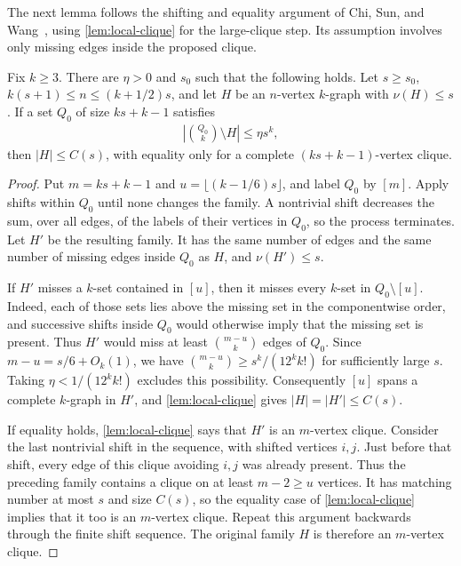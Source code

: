 The next lemma follows the shifting and equality argument of Chi, Sun, and Wang~\cite[Theorem 8.8]{CSW2026}, using \cref{lem:local-clique} for the large-clique step. Its assumption involves only missing edges inside the proposed clique.
\begin{lemma}\label{lem:clique-exact}
Fix $k\ge3$. There are $\eta>0$ and $s_0$ such that the following holds. Let $s\ge s_0$, $k(s+1)\le n\le(k+1/2)s$, and let $H$ be an $n$-vertex $k$-graph with $\nu(H)\le s$. If a set $Q_0$ of size $ks+k-1$ satisfies
\begin{align*}
\left|\binom{Q_0}k\setminus H\right|\le\eta s^k,
\end{align*}
then $|H|\le C(s)$, with equality only for a complete $(ks+k-1)$-vertex clique.
\end{lemma}
\begin{proof}
Put $m=ks+k-1$ and $u=\lfloor(k-1/6)s\rfloor$, and label $Q_0$ by $[m]$. Apply shifts within $Q_0$ until none changes the family. A nontrivial shift decreases the sum, over all edges, of the labels of their vertices in $Q_0$, so the process terminates. Let $H'$ be the resulting family. It has the same number of edges and the same number of missing edges inside $Q_0$ as $H$, and $\nu(H')\le s$.

If $H'$ misses a $k$-set contained in $[u]$, then it misses every $k$-set in $Q_0\setminus[u]$. Indeed, each of those sets lies above the missing set in the componentwise order, and successive shifts inside $Q_0$ would otherwise imply that the missing set is present. Thus $H'$ would miss at least $\binom{m-u}k$ edges of $Q_0$. Since $m-u=s/6+O_k(1)$, we have $\binom{m-u}k\ge s^k/(12^kk!)$ for sufficiently large $s$. Taking $\eta<1/(12^kk!)$ excludes this possibility. Consequently $[u]$ spans a complete $k$-graph in $H'$, and \cref{lem:local-clique} gives $|H|=|H'|\le C(s)$.

If equality holds, \cref{lem:local-clique} says that $H'$ is an $m$-vertex clique. Consider the last nontrivial shift in the sequence, with shifted vertices $i,j$. Just before that shift, every edge of this clique avoiding $i,j$ was already present. Thus the preceding family contains a clique on at least $m-2\ge u$ vertices. It has matching number at most $s$ and size $C(s)$, so the equality case of \cref{lem:local-clique} implies that it too is an $m$-vertex clique. Repeat this argument backwards through the finite shift sequence. The original family $H$ is therefore an $m$-vertex clique.
\end{proof}

